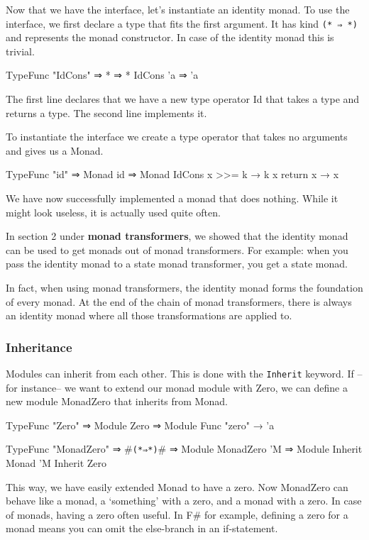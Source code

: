 Now that we have the interface, let's instantiate an identity monad.
To use the interface, we first declare a type that fits the first argument.
It has kind \verb|(* ⇒ *)| and represents the monad constructor.
In case of the identity monad this is trivial.

\begin{code}
  TypeFunc "IdCons" ⇒ * ⇒ *
  IdCons 'a ⇒ 'a
\end{code}

The first line declares that we have a new type operator Id that takes a type and returns a type.
The second line implements it. 

To instantiate the interface we create a type operator that takes no arguments and gives us a Monad.

\begin{code}
  TypeFunc "id" ⇒ Monad 
  id ⇒ Monad IdCons {
    x >>= k → k x
    return x → x
  }
\end{code}

We have now successfully implemented a monad that does nothing.
While it might look useless, it is actually used quite often.

In section 2 under \textbf{monad transformers},
we showed that the identity monad can be used to get monads out of monad transformers.
For example: when you pass the identity monad to a state monad transformer, you get a state monad.

In fact, when using monad transformers, the identity monad forms the foundation of every monad.
At the end of the chain of monad transformers, there is always an identity monad where all those transformations are applied to.

\subsubsection*{Inheritance}
Modules can inherit from each other.
This is done with the \verb|Inherit| keyword. 
If --for instance-- we want to extend our monad module with Zero,
we can define a new module MonadZero that inherits from Monad.

\begin{code}
  TypeFunc "Zero" ⇒ Module
  Zero ⇒ Module {
    Func "zero" → 'a
  }

  TypeFunc "MonadZero" ⇒ #\verb|(*⇒*)|# ⇒ Module
  MonadZero 'M ⇒ Module {
    Inherit Monad 'M
    Inherit Zero
  }
\end{code}

This way, we have easily extended Monad to have a zero.
Now MonadZero can behave like a monad, a `something' with a zero, and a monad with a zero.
In case of monads, having a zero often useful.
In F\# for example, defining a zero for a monad means you can omit the else-branch in an if-statement.
